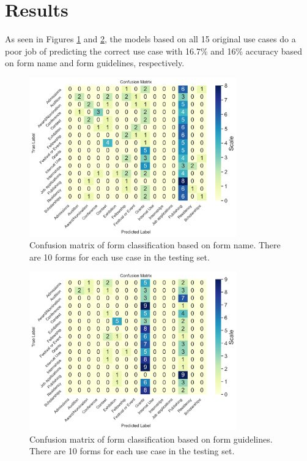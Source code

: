 \documentclass{article}
\begin{document}
\section{Results}

As seen in Figures \ref{fig:nameConfusion} and \ref{fig:descConfusion}, the models based on all 15 original use cases do a poor job of predicting the correct use case with 16.7\% and 16\% accuracy based on form name and form guidelines, respectively. 
\begin{figure}[h!]
    \centering
    \includegraphics[width=0.8\textwidth]{nameConfusion.png}
    \caption{Confusion matrix of form classification based on form name. There are 10 forms for each use case in the testing set.}
    \label{fig:nameConfusion}
\end{figure}

\begin{figure}[h!]
    \centering
    \includegraphics[width=0.8\textwidth]{descConfusion.png}
    \caption{Confusion matrix of form classification based on form guidelines. There are 10 forms for each use case in the testing set.}
    \label{fig:descConfusion}
\end{figure}
\end{document}
